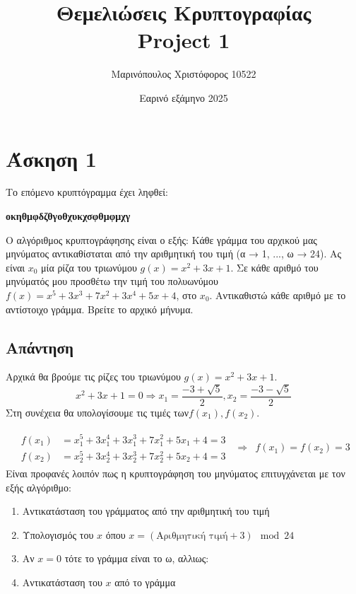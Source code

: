 \documentclass[12pt]{article}
\title{\vspace{-2cm} Θεμελιώσεις Κρυπτογραφίας \\
        Project 1}
\author{Μαρινόπουλος Χριστόφορος 10522}
\date{Εαρινό εξάμηνο 2025}
\begin{document}
\maketitle
\renewcommand{\contentsname}{Περιεχόμενα}
\tableofcontents
\newpage
\section*{Άσκηση 1}
Το επόμενο κρυπτόγραμμα έχει ληφθεί:
\begin{center}
\textbf{οκηθμφδζθγοθχυκχσφθμφμχγ}
\end{center}
Ο αλγόριθμος κρυπτογράφησης είναι ο εξής: Κάθε γράμμα του αρχικού μας μηνύματος αντικαθίσταται από την αριθμητική του τιμή (α → 1, ..., ω → 24). Ας είναι \( x_0 \) μία ρίζα του τριωνύμου \( g(x) = x^2 + 3x + 1 \). Σε κάθε αριθμό του μηνύματός μου προσθέτω την τιμή του πολυωνύμου \( f(x) = x^5 + 3x^3 + 7x^2 + 3x^4 + 5x + 4 \), στο \( x_0 \). Αντικαθιστώ κάθε αριθμό με το αντίστοιχο γράμμα. Βρείτε το αρχικό μήνυμα.


\subsection*{Απάντηση}
Αρχικά θα βρούμε τις ρίζες του τριωνύμου \( g(x) = x^2 + 3x + 1 \).
\[
x^2 + 3x + 1 = 0 \Rightarrow x_1 = \frac{-3+\sqrt{5}}{2}, x_2 =\frac{-3-\sqrt{5}}{2} 
\]
Στη συνέχεια θα υπολογίσουμε τις τιμές των\(f(x_1), f(x_2)\).

\begin{equation*}
\begin{array}{ccc}
\begin{aligned}
f(x_1) &= x_1^5 + 3x_1^4 + 3x_1^3 + 7x_1^2 + 5x_1 + 4 = 3 \\
f(x_2) &= x_2^5 + 3x_2^4 + 3x_2^3 + 7x_2^2 + 5x_2 + 4 = 3 
\end{aligned}
& \Rightarrow &
f(x_1) = f(x_2) = 3
\end{array}
\end{equation*}
Είναι προφανές λοιπόν πως η κρυπτογράφηση του μηνύματος επιτυγχάνεται με τον εξής αλγόριθμο:
\begin{enumerate}
    \item Αντικατάσταση του γράμματος από την αριθμητική του τιμή
    \item Υπολογισμός του \( x \) όπου \( x = (\text{Αριθμητική τιμή} + 3) \mod 24 \)
    \item Αν \( x = 0 \) τότε το γράμμα είναι το ω, αλλιως: 
    \item Αντικατάσταση του \( x \) από το γράμμα
\end{enumerate}
\end{document}
